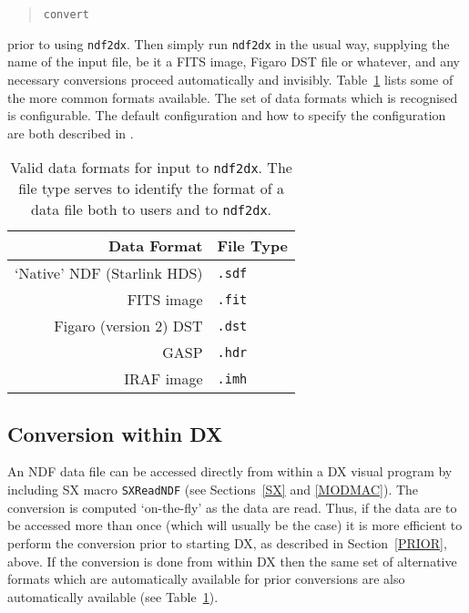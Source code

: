 \begin{quote}
{\tt convert}
\end{quote}

prior to using {\tt ndf2dx}. Then simply run {\tt ndf2dx} in the
usual way, supplying the name of the input file, be it a FITS image,
Figaro DST file or whatever, and any necessary conversions proceed
automatically and invisibly. Table~\ref{FORMATS} lists some of the
more common formats available. The set of data formats which is
recognised is configurable. The default configuration and how to specify
the configuration are both described in
\cite{SUN55}.

\begin{table}[htbp]

\begin{center}
\begin{tabular}{rl}
Data Format                  & File Type \\ \hline
`Native' NDF (Starlink HDS)  & {\tt .sdf}  \\
FITS image                   & {\tt .fit}  \\
Figaro (version 2) DST       & {\tt .dst}  \\
GASP                         & {\tt .hdr}  \\
IRAF image                   & {\tt .imh}  \\
\end{tabular}

\caption[Valid data formats for input to {\tt ndf2dx}.]
{Valid data formats for input to {\tt ndf2dx}. The file type serves to
identify the format of a data file both to users and to {\tt ndf2dx}.
\label{FORMATS} }

\end{center}
\end{table}

\subsection{Conversion within DX}

An NDF data file can be accessed directly from within a DX visual
program by including SX macro {\tt SXReadNDF} (see Sections~\ref{SX} and
\ref{MODMAC}). The conversion is computed `on-the-fly' as the data are
read. Thus, if the data are to be accessed more than once (which will
usually be the case) it is more efficient to perform the conversion
prior to starting DX, as described in Section~\ref{PRIOR}, above.
If the conversion is done from within DX then the same set of
alternative formats which are automatically available for prior
conversions are also automatically available (see Table~\ref{FORMATS}).


